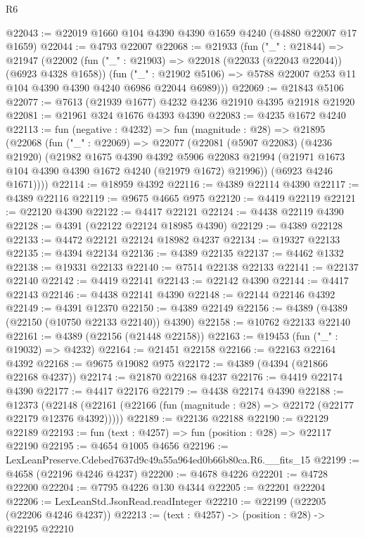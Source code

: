 \begin{lexlean}{R6}
\begin{coremodule}
@22043 := @22019 @1660 @104 @4390 @4390 @1659 @4240 (@4880 @22007 @17 @1659)
@22044 := @4793 @22007
@22068 := @21933
    (fun ("_" : @21844) =>
    @21947
      (@22002
        (fun ("_" : @21903) => @22018 (@22033 (@22043 @22044)) (@6923 @4328 @1658))
        (fun ("_" : @21902 @5106) =>
        @5788 @22007 @253 @11 @104 @4390 @4390 @4240 @6986 @22044 @6989)))
@22069 := @21843 @5106
@22077 := @7613 (@21939 @1677) @4232 @4236 @21910 @4395 @21918 @21920
@22081 := @21961 @324 @1676 @4393 @4390
@22083 := @4235 @1672 @4240
@22113 := fun (negative : @4232) =>
  fun (magnitude : @28) =>
  @21895
    (@22068
      (fun ("_" : @22069) =>
      @22077
        (@22081
          (@5907 @22083)
          (@4236 @21920)
          (@21982
            @1675
            @4390
            @4392
            @5906
            @22083
            @21994
            (@21971 @1673 @104 @4390 @4390 @1672 @4240 (@21979 @1672) @21996))
          (@6923 @4246 @1671))))
@22114 := @18959 @4392
@22116 := @4389 @22114 @4390
@22117 := @4389 @22116
@22119 := @9675 @4665 @975
@22120 := @4419 @22119
@22121 := @22120 @4390
@22122 := @4417 @22121
@22124 := @4438 @22119 @4390
@22128 := @4391 (@22122 @22124 @18985 @4390)
@22129 := @4389 @22128
@22133 := @4472 @22121 @22124 @18982 @4237
@22134 := @19327 @22133
@22135 := @4394 @22134
@22136 := @4389 @22135
@22137 := @4462 @1332
@22138 := @19331 @22133
@22140 := @7514 @22138 @22133
@22141 := @22137 @22140
@22142 := @4419 @22141
@22143 := @22142 @4390
@22144 := @4417 @22143
@22146 := @4438 @22141 @4390
@22148 := @22144 @22146 @4392
@22149 := @4391 @12370
@22150 := @4389 @22149
@22156 := @4389 (@4389 (@22150 (@10750 @22133 @22140)) @4390)
@22158 := @10762 @22133 @22140
@22161 := @4389 (@22156 (@21448 @22158))
@22163 := @19453 (fun ("_" : @19032) => @4232)
@22164 := @21451 @22158
@22166 := @22163 @22164 @4392
@22168 := @9675 @19082 @975
@22172 := @4389 (@4394 (@21866 @22168 @4237))
@22174 := @21870 @22168 @4237
@22176 := @4419 @22174 @4390
@22177 := @4417 @22176
@22179 := @4438 @22174 @4390
@22188 := @12373
    (@22148 (@22161 (@22166 (fun (magnitude : @28) => @22172 (@22177 @22179 @12376 @4392)))))
@22189 := @22136 @22188
@22190 := @22129 @22189
@22193 := fun (text : @4257) => fun (position : @28) => @22117 @22190
@22195 := @4654 @1005 @4656
@22196 := LexLeanPreserve.Cdebed7637d9c49a55a964ed0b66b80ca.R6.__fits_15
@22199 := @4658 (@22196 @4246 @4237)
@22200 := @4678 @4226
@22201 := @4728 @22200
@22204 := @7795 @4226 @130 @4344
@22205 := @22201 @22204
@22206 := LexLeanStd.JsonRead.readInteger
@22210 := @22199 (@22205 (@22206 @4246 @4237))
@22213 := (text : @4257) -> (position : @28) -> @22195 @22210

\end{coremodule}
\end{lexlean}
